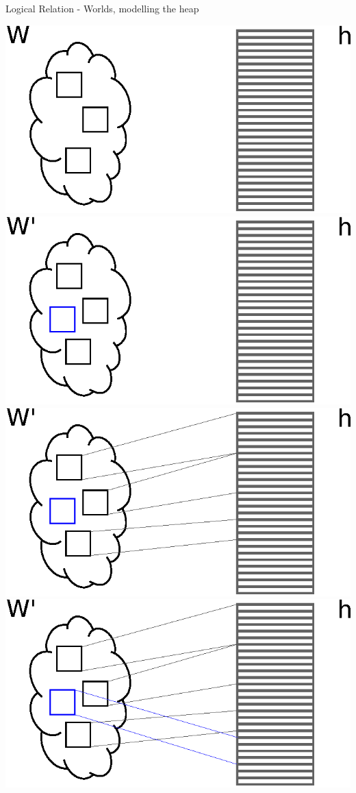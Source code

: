 \documentclass{beamer}
\begin{document}
\begin{frame}{Logical Relation - Worlds, modelling the heap}
\begin{overprint}
  \includegraphics{world2.eps}
  \includegraphics{world11.eps}
  \includegraphics{world9.eps}
  \includegraphics{world10.eps}
\end{overprint}

\end{frame}
\end{document}
